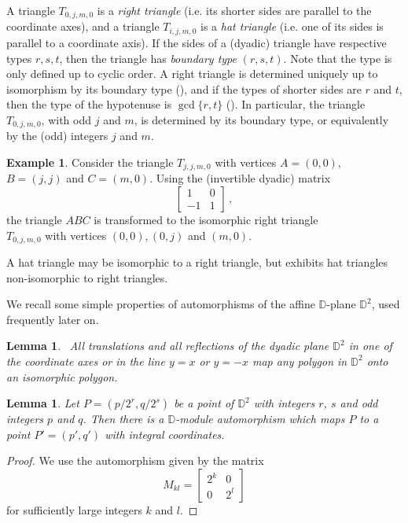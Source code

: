\documentclass[12pt]{amsart}
\def\mbD{\mathbb{D}}
\theoremstyle{plain}
\newtheorem{lemma}[theorem]{Lemma}
\theoremstyle{definition}
\newtheorem{example}[theorem]{Example}
\numberwithin{equation}{section}
\begin{document}
A triangle $T_{0,j,m,0}$ is a \emph{right triangle} (i.e. its shorter sides are parallel to the coordinate axes), and a triangle $T_{i,j,m,0}$ is a \emph{hat triangle} (i.e. one of its
sides is parallel to a coordinate axis). If the sides of a (dyadic) triangle have respective
types $r, s, t$, then the triangle has \emph{boundary type} $(r,s,t)$. Note that the type is
only defined up to cyclic order.
A right triangle is determined uniquely up
to isomorphism by its boundary type (\cite[Cor.~4.5]{MRS11}), and if the types of shorter sides are $r$ and $t$, then the type of the hypotenuse is $\gcd\{r,t\}$ (\cite[Pythagoras'
Thm.~4.3]{MRS11}). In particular, the triangle $T_{0,j,m,0}$, with odd $j$ and $m$, is
determined by its boundary type, or equivalently by the (odd) integers $j$ and $m$.


\begin{example}\label{Ex:jjm}
Consider the triangle $T_{j,j,m,0}$ with vertices $A = (0,0),$ $ B = (j,j)$ and $C = (m,0)$. Using the (invertible dyadic) matrix
\begin{equation}
\begin{bmatrix}
1 & 0 \\
-1 & 1
\end{bmatrix}\,,
\end{equation}
the triangle $ABC$ is transformed to the isomorphic right triangle\\ $T_{0,j,m,0}$ with
vertices $(0,0), (0,j)$ and $(m,0)$.
\end{example}

A hat triangle may be isomorphic to a right triangle, but \cite[Example~$4.6$]{MMR19a} exhibits hat triangles non-isomorphic to right triangles.


We recall some simple properties of automorphisms of the affine $\mbD$-plane $\mbD^2$, used frequently later on.


\begin{lemma}~\cite{MRS11}\label{L:transrefl}
All translations and all reflections of the dyadic plane $\mbD^2$ in one of the coordinate axes or in the line $y = x$ or $y = -x$ map any polygon in $\mbD^2$ onto an isomorphic polygon.
\end{lemma}


\begin{lemma}\label{L:fracint}
Let $P = ({p}/{2^r},{q}/{2^s})$ be a point of $\mbD^2$
with integers $r$, $s$ and odd integers $p $ and $q$. Then there is a $\mbD$-module
automorphism which maps $P$ to a point $P' = (p',q')$ with integral coordinates.
\end{lemma}
\begin{proof}
We use the automorphism given by the matrix
\begin{equation}\label{E:kl}
M_{kl} = \begin{bmatrix}
2^k & 0 \\
0 & 2^l
\end{bmatrix}
\end{equation}
for sufficiently large integers $k$ and $l$.
\end{proof}
\end{document}
